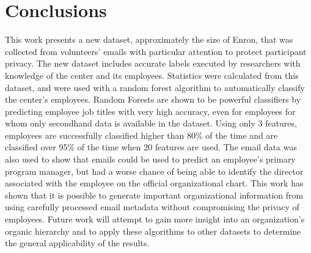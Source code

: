 \documentclass[12pt]{report}
\begin{document}



\chapter{Conclusions} \label{Conclusions}
This work presents a new dataset, approximately the size of Enron, that was collected from volunteers' emails with particular attention to protect participant privacy.
The new dataset includes accurate labels executed by researchers with knowledge of the center and its employees.
Statistics were calculated from this dataset, and were used with a random forest algorithm to automatically classify the center's employees.
Random Forests are shown to be powerful classifiers by predicting employee job titles with very high accuracy, even for employees for whom only secondhand data is available in the dataset.
Using only 3 features, employees are successfully classified higher than 80\% of the time and are classified over 95\% of the time when 20 features are used.
The email data was also used to show that emails could be used to predict an employee's primary program manager, but had a worse chance of being able to identify the director associated with the employee on the official organizational chart.
This work has shown that it is possible to generate important organizational information from using carefully processed email metadata without compromising the privacy of employees.
Future work will attempt to gain more insight into an organization's organic hierarchy and to apply these algorithms to other datasets to determine the general applicability of the results.




%
%

%







\end{document}
